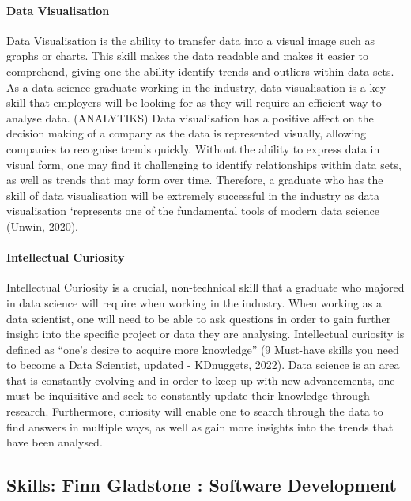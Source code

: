 \documentclass[a4paper, 11pt]{report}
\begin{document}
	\paragraph {Data Visualisation} Data Visualisation is the ability to transfer data into a visual image such as graphs or charts. This skill makes the data readable and makes it easier to comprehend, giving one the ability identify trends and outliers within data sets. As a data science graduate working in the industry, data visualisation is a key skill that employers will be looking for as they will require an efficient way to analyse data. (ANALYTIKS) Data visualisation has a positive affect on the decision making of a company as the data is represented visually, allowing companies to recognise trends quickly. Without the ability to express data in visual form, one may find it challenging to identify relationships within data sets, as well as trends that may form over time. Therefore, a graduate who has the skill of data visualisation will be extremely successful in the industry as data visualisation ‘represents one of the fundamental tools of modern data science (Unwin, 2020).
	
	\paragraph {Intellectual Curiosity} Intellectual Curiosity is a crucial, non-technical skill that a graduate who majored in data science will require when working in the industry. When working as a data scientist, one will need to be able to ask questions in order to gain further insight into the specific project or data they are analysing. Intellectual curiosity is defined as “one’s desire to acquire more knowledge” (9 Must-have skills you need to become a Data Scientist, updated - KDnuggets, 2022). Data science is an area that is constantly evolving and in order to keep up with new advancements, one must be inquisitive and seek to constantly update their knowledge through research. Furthermore, curiosity will enable one to search through the data to find answers in multiple ways, as well as gain more insights into the trends that have been analysed. 
	
	\subsection{Skills: Finn Gladstone : Software Development}
	
\end{document}
